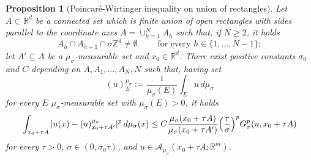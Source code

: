 \documentclass{article}
\theoremstyle{plain}
\newtheorem{proposition}[theorem]{Proposition}
\theoremstyle{definition}
\def\rr{{\mathbb R}}
\def\ZZ{{\mathbb Z}}
\def\ms{\mu_\sigma}
\newcommand{\s}{\sigma}
\numberwithin{equation}{section}
\begin{document}
\begin{proposition}[Poincaré-Wirtinger inequality on union of rectangles]
\label{Poincaré-Wirtinger inequality on union of rectangles}
Let $A\subset \mathbb{R}^{d}$ be a connected set which is finite union of open rectangles with sides parallel to the coordinate axes $A=\cup_{h=1}^NA_h$ such that, if $N\geq 2$, it holds 
\begin{equation*}
    A_h\cap A_{h+1}\cap \s\ZZ^d\neq \emptyset \qquad \text{ for every } h\in\{1,\dots,N-1\};
\end{equation*}
let $A'\subseteq A$ be a $\ms$-measurable set and $x_0\in \rr^d$. There exist positive constants $\s_{0}$ and $C$ depending on $A, A_1,\dots, A_N, N$ such that, having set
\begin{equation*}
    (u)^{\ms}_E:=\frac{1}{\ms(E)}\int_{E} u\,d\ms
\end{equation*}
for every $E$ $\ms$-measurable set with $\ms(E)>0$, it holds 
\begin{equation}\label{PW-app}
    \int_{x_0+\tau A} |u(x)-(u)^{\ms}_{x_0+\tau A'}|^p\,d\ms(x)\leq C\frac{\ms(x_0+\tau A)}{\ms(x_0+\tau A')}\Bigl(\frac{\tau}{\s}\Bigr)^p G^{p}_\s(u,x_0+\tau A)
\end{equation}
    for every $\tau>0$, $\s\in(0,\s_0\tau)$, and $u \in \mathcal{A}_{\mu_\sigma}(x_0+\tau A;\mathbb{R}^m)$.  
    \end{proposition}
    
\end{document}
